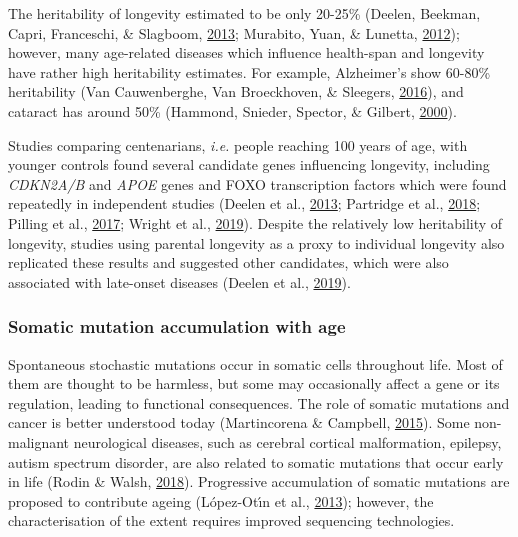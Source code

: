 \documentclass[12pt,twoside]{unicam}
\begin{document}
The heritability of longevity estimated to be only 20-25\% (Deelen, Beekman, Capri, Franceschi, \& Slagboom, \protect\hyperlink{ref-Deelen2013}{2013}; Murabito, Yuan, \& Lunetta, \protect\hyperlink{ref-Murabito2012}{2012}); however, many age-related diseases which influence health-span and longevity have rather high heritability estimates. For example, Alzheimer's show 60-80\% heritability (Van Cauwenberghe, Van Broeckhoven, \& Sleegers, \protect\hyperlink{ref-VanCauwenberghe2016}{2016}), and cataract has around 50\% (Hammond, Snieder, Spector, \& Gilbert, \protect\hyperlink{ref-Hammond2000}{2000}).

Studies comparing centenarians, \emph{i.e.} people reaching 100 years of age, with younger controls found several candidate genes influencing longevity, including \emph{CDKN2A/B} and \emph{APOE} genes and FOXO transcription factors which were found repeatedly in independent studies (Deelen et al., \protect\hyperlink{ref-Deelen2013}{2013}; Partridge et al., \protect\hyperlink{ref-Partridge2018}{2018}; Pilling et al., \protect\hyperlink{ref-Pilling2017}{2017}; Wright et al., \protect\hyperlink{ref-Wright2019}{2019}). Despite the relatively low heritability of longevity, studies using parental longevity as a proxy to individual longevity also replicated these results and suggested other candidates, which were also associated with late-onset diseases (Deelen et al., \protect\hyperlink{ref-Deelen2019}{2019}).

\hypertarget{somatic-mutation-accumulation-with-age}{%
\subsubsection{Somatic mutation accumulation with age}\label{somatic-mutation-accumulation-with-age}}

Spontaneous stochastic mutations occur in somatic cells throughout life. Most of them are thought to be harmless, but some may occasionally affect a gene or its regulation, leading to functional consequences. The role of somatic mutations and cancer is better understood today (Martincorena \& Campbell, \protect\hyperlink{ref-Martincorena2015}{2015}). Some non-malignant neurological diseases, such as cerebral cortical malformation, epilepsy, autism spectrum disorder, are also related to somatic mutations that occur early in life (Rodin \& Walsh, \protect\hyperlink{ref-Rodin2018}{2018}). Progressive accumulation of somatic mutations are proposed to contribute ageing (López-Otı́n et al., \protect\hyperlink{ref-Lopez-Otin2013}{2013}); however, the characterisation of the extent requires improved sequencing technologies.
\end{document}
